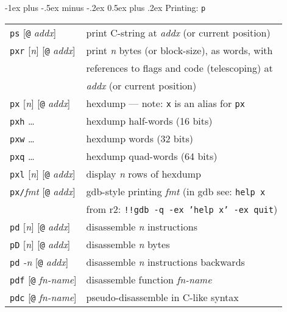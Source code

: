 \documentclass[a4paper,landscape]{article}
\makeatletter
\renewcommand{\section}{\@startsection{section}{1}{0mm}%
                                {-1ex plus -.5ex minus -.2ex}%
                                {0.5ex plus .2ex}%
                                {\normalfont\large\bfseries}}
\makeatother
\begin{document}
\begin{multicols*}{3}
\section{Printing: \texttt{p}}
\begin{tabular}{@{}ll@{}}
\texttt{ps} [\texttt{@} \textit{addx}]& print C-string at \textit{addx} (or current position) \\
\texttt{pxr} [\textit{n}] [\texttt{@} \textit{addx}] & print \textit{n} bytes (or block-size), as words, with \\ & references to flags and code (telescoping) at \\ & \textit{addx} (or current position)\\
\texttt{px} [\textit{n}] [\texttt{@} \textit{addx}] & hexdump --- note: \texttt{x} is an alias for \texttt{px}\\
\texttt{pxh} \ldots & hexdump half-words (16 bits) \\
\texttt{pxw} \ldots & hexdump words (32 bits) \\
\texttt{pxq} \ldots & hexdump quad-words (64 bits) \\
\texttt{pxl} [\textit{n}] [\texttt{@} \textit{addx}] & display \textit{n} rows of hexdump \\
\texttt{px/}\textit{fmt} [\texttt{@} \textit{addx}] & gdb-style printing \textit{fmt} (in gdb see: \texttt{help x} \\ & from r2: \texttt{!!gdb -q -ex 'help x' -ex quit}) \\
\texttt{pd} [\textit{n}] [\texttt{@} \textit{addx}] & disassemble \textit{n} instructions \\
\texttt{pD} [\textit{n}] [\texttt{@} \textit{addx}] & disassemble \textit{n} bytes \\
\texttt{pd} \textit{-n}  [\texttt{@} \textit{addx}] & disassemble \textit{n} instructions backwards \\
\texttt{pdf} [\texttt{@} \textit{fn-name}] & disassemble function \textit{fn-name} \\
\texttt{pdc} [\texttt{@} \textit{fn-name}] & pseudo-disassemble in C-like syntax
\end{tabular}


\end{multicols*}
\end{document}
